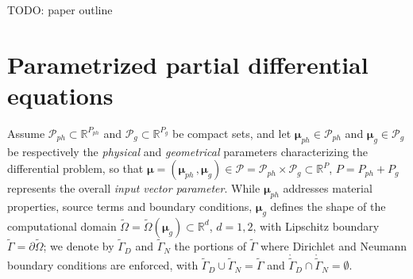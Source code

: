 \documentclass{elsarticle}
\theoremstyle{theorem}
\theoremstyle{definition}
\theoremstyle{remark}
\theoremstyle{proposition}
\numberwithin{figure}{section}
\newcommand{\wt}[1]{\widetilde{#1}}
\newcommand{\bg}[1]{\boldsymbol{#1}}
\begin{document}
		TODO: paper outline
		
		
	\section{Parametrized partial differential equations}
	\label{section:Parametrized partial differential equations}
	
		Assume $\mathcal{P}_{ph} \subset \mathbb{R}^{P_{ph}}$ and $\mathcal{P}_g \subset \mathbb{R}^{P_{g}}$ be compact sets, and let $\boldsymbol{\mu}_{ph} \in \mathcal{P}_{ph}$ and $\boldsymbol{\mu}_{g} \in \mathcal{P}_{g}$ be respectively the \emph{physical} and \emph{geometrical} parameters characterizing the differential problem, so that $\boldsymbol{\mu} = (\boldsymbol{\mu}_{ph} \, , \boldsymbol{\mu}_{g}) \in \mathcal{P} = \mathcal{P}_{ph} \times \mathcal{P}_g \subset \mathbb{R}^P$, $P = P_{ph} + P_g$ represents the overall \emph{input vector parameter}. While $\bg{\mu}_{ph}$ addresses material properties, source terms and boundary conditions, $\bg{\mu}_g$ defines the shape of the computational domain $\wt{\Omega} = \wt{\Omega}(\boldsymbol{\mu}_g) \subset \mathbb{R}^d$, $d = 1,2$, with Lipschitz boundary $\wt{\Gamma} = \partial \wt{\Omega}$; we denote by $\wt{\Gamma}_D$ and $\wt{\Gamma}_N$ the portions of $\wt{\Gamma}$ where Dirichlet and Neumann boundary conditions are enforced, with $\wt{\Gamma}_D \cup \wt{\Gamma}_N = \wt{\Gamma}$ and $\mathring{\wt{\Gamma}}_D \cap \mathring{\wt{\Gamma}}_N = \emptyset$.
		
\end{document}
